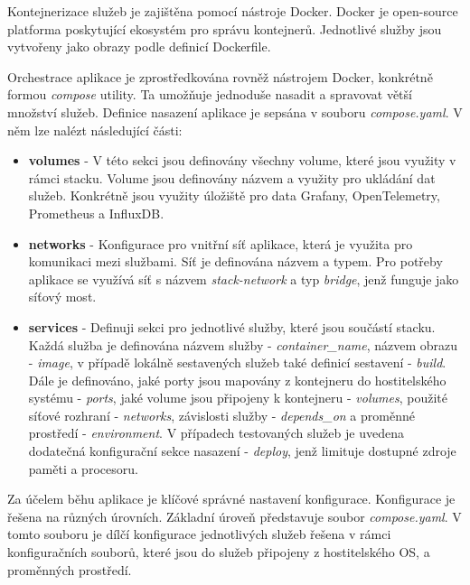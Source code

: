 

Kontejnerizace služeb je zajištěna pomocí nástroje Docker. Docker je open-source platforma poskytující ekosystém pro správu kontejnerů. Jednotlivé služby jsou vytvořeny jako obrazy podle definicí Dockerfile. 

Orchestrace aplikace je zprostředkována rovněž nástrojem Docker, konkrétně formou \emph{compose} utility. Ta umožňuje jednoduše nasadit a spravovat větší množství služeb. Definice nasazení aplikace je sepsána v souboru \emph{compose.yaml}. V něm lze nalézt následující části:

\begin{itemize}
  \item \textbf{volumes} - V této sekci jsou definovány všechny volume, které jsou využity v rámci stacku. Volume jsou definovány názvem a využity pro ukládání dat služeb. Konkrétně jsou využity úložiště pro data Grafany, OpenTelemetry, Prometheus a InfluxDB.
  \item \textbf{networks} - Konfigurace pro vnitřní síť aplikace, která je využita pro komunikaci mezi službami. Síť je definována názvem a typem. Pro potřeby aplikace se využívá síť s názvem \emph{stack-network} a typ \emph{bridge}, jenž funguje jako síťový most.
  \item \textbf{services} - Definuji sekci pro jednotlivé služby, které jsou součástí stacku. Každá služba je definována názvem služby - \emph{container\_name}, názvem obrazu - \emph{image}, v případě lokálně sestavených služeb také definicí sestavení - \emph{build}. Dále je definováno, jaké porty jsou mapovány z kontejneru do hostitelského systému - \emph{ports}, jaké volume jsou připojeny k kontejneru - \emph{volumes}, použité síťové rozhraní - \emph{networks}, závislosti služby - \emph{depends\_on} a proměnné prostředí - \emph{environment}. V případech testovaných služeb je uvedena dodatečná konfigurační sekce nasazení - \emph{deploy}, jenž limituje dostupné zdroje paměti a procesoru.
\end{itemize}


Za účelem běhu aplikace je klíčové správné nastavení konfigurace. Konfigurace je řešena na různých úrovních. Základní úroveň představuje soubor \emph{compose.yaml}. V tomto souboru je dílčí konfigurace jednotlivých služeb řešena v rámci konfiguračních souborů, které jsou do služeb připojeny z hostitelského OS, a proměnných prostředí. 

